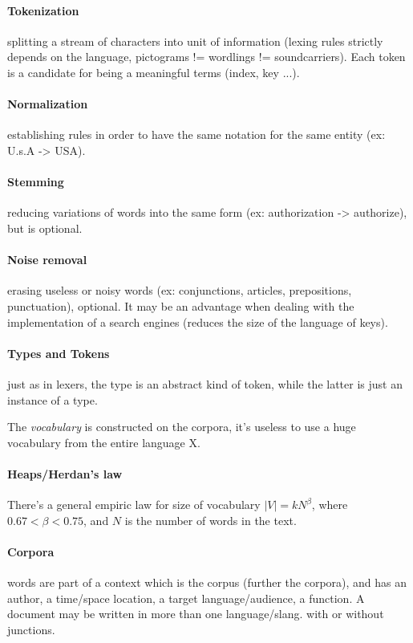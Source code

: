\paragraph{Tokenization} splitting a stream of characters into unit of information (lexing rules strictly depends on the language, pictograms != wordlings != soundcarriers).
Each token is a candidate for being a meaningful terms (index, key ...).

\paragraph{Normalization} establishing rules in order to have the same notation for the same entity (ex: U.s.A -> USA).

\paragraph{Stemming} reducing variations of words into the same form (ex: authorization -> authorize), but is optional.

\paragraph{Noise removal} erasing useless or noisy words (ex: conjunctions, articles, prepositions, punctuation), optional.
It may be an advantage when dealing with the implementation of a search engines (reduces the size of the language of keys).

\paragraph{Types and Tokens} just as in lexers, the type is an abstract kind of token, while the latter is just an instance of a type.

The \textit{vocabulary} is constructed on the corpora, it's useless to use a huge vocabulary from the entire language X.

\paragraph{Heaps/Herdan's law} There's a general empiric law for size of vocabulary $|V| = kN^\beta$, where $0.67 < \beta < 0.75$, and $N$ is the number of words in the text.

\paragraph{Corpora} words are part of a context which is the corpus (further the corpora), and has an author, a time/space location, a target language/audience, a function. A document may be written in more than one language/slang. with or without junctions.

